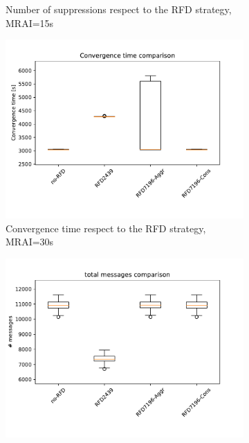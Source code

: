 \begin{figure}[H]
\begin{subfigure}[b]{0.325\textwidth}
         \caption{Number of suppressions respect to the RFD strategy, MRAI=15s}
         \label{fig:1000_RFD_MRAI30_suppressions_mice}
     \end{subfigure}
     \vfill
     \begin{subfigure}[b]{0.325\textwidth}
         \centering
         \includegraphics[width=\textwidth]{images/RFD/miceVSelephants/MultiMRAI/30/mice/cisco_1000MRAI30_rfd_comparison_time_boxplot.pdf}
         \caption{Convergence time respect to the RFD strategy, MRAI=30s}
         \label{fig:1000_RFD_MRAI30_time_mice}
     \end{subfigure}
     \hfill
     \begin{subfigure}[b]{0.325\textwidth}
         \centering
         \includegraphics[width=\textwidth]{images/RFD/miceVSelephants/MultiMRAI/30/mice/cisco_1000MRAI30_rfd_comparison_messages_boxplot.pdf}

\end{subfigure}
\end{figure}

